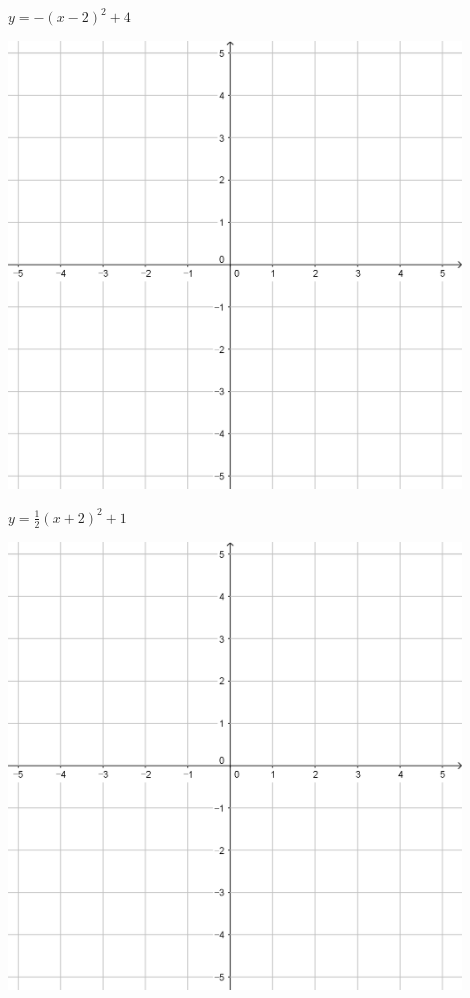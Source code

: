 \documentclass{oblivoir}
\begin{document}
\begin{minipage}{0.45\textwidth}\centering
\(y=-(x-2)^2+4\)
\par\bigskip\includegraphics[width=0.9\textwidth]{55}
\end{minipage}
\begin{minipage}{0.45\textwidth}\centering
\(y=\frac12(x+2)^2+1\)
\par\bigskip\includegraphics[width=0.9\textwidth]{55}
\end{minipage}\bigskip\bigskip\par
\end{document}
